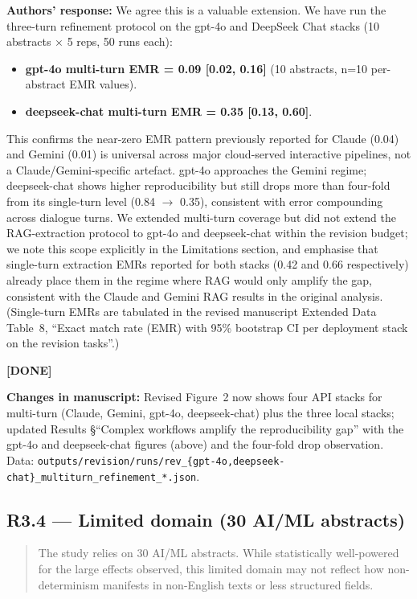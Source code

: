 \documentclass[11pt,a4paper]{article}
\newenvironment{revquote}{%
  \begin{quote}\small\itshape\color{revgray}
}{%
  \end{quote}
}
\newcommand{\response}[1]{\par\noindent\textbf{\color{revgreen}Authors' response:} #1\par}
\newcommand{\changes}[1]{\par\noindent\textbf{\color{revblue}Changes in manuscript:} #1\par}
\newcommand{\done}{\color{revgreen}\textbf{[DONE]}}
\begin{document}
\response{We agree this is a valuable extension. We have run the three-turn refinement protocol on the gpt-4o and DeepSeek Chat stacks (10 abstracts $\times$ 5 reps, 50 runs each):

\begin{itemize}[leftmargin=*]
  \item \textbf{gpt-4o multi-turn EMR = 0.09 [0.02, 0.16]} (10 abstracts, n=10 per-abstract EMR values).
  \item \textbf{deepseek-chat multi-turn EMR = 0.35 [0.13, 0.60]}.
\end{itemize}

This confirms the near-zero EMR pattern previously reported for Claude (0.04) and Gemini (0.01) is universal across major cloud-served interactive pipelines, not a Claude/Gemini-specific artefact. gpt-4o approaches the Gemini regime; deepseek-chat shows higher reproducibility but still drops more than four-fold from its single-turn level (0.84 $\rightarrow$ 0.35), consistent with error compounding across dialogue turns. We extended multi-turn coverage but did not extend the RAG-extraction protocol to gpt-4o and deepseek-chat within the revision budget; we note this scope explicitly in the Limitations section, and emphasise that single-turn extraction EMRs reported for both stacks (0.42 and 0.66 respectively) already place them in the regime where RAG would only amplify the gap, consistent with the Claude and Gemini RAG results in the original analysis. (Single-turn EMRs are tabulated in the revised manuscript Extended Data Table~8, ``Exact match rate (EMR) with 95\% bootstrap CI per deployment stack on the revision tasks''.)} \done

\changes{Revised Figure~2 now shows four API stacks for multi-turn (Claude, Gemini, gpt-4o, deepseek-chat) plus the three local stacks; updated Results §``Complex workflows amplify the reproducibility gap'' with the gpt-4o and deepseek-chat figures (above) and the four-fold drop observation. Data: \texttt{outputs/revision/runs/rev\_\{gpt-4o,deepseek-chat\}\_multiturn\_refinement\_*.json}.}

\subsection*{R3.4 --- Limited domain (30 AI/ML abstracts)}

\begin{revquote}
The study relies on 30 AI/ML abstracts. While statistically well-powered for the large effects observed, this limited domain may not reflect how non-determinism manifests in non-English texts or less structured fields.
\end{revquote}
\end{document}
